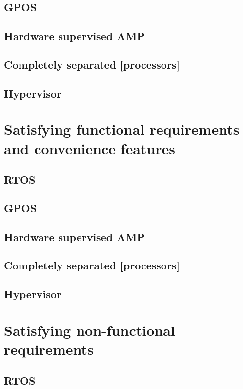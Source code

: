 \subsection{GPOS}
\subsection{Hardware supervised AMP}
\subsection{Completely separated [processors]}
\subsection{Hypervisor}


\section{Satisfying functional requirements and convenience features}
\subsection{RTOS}
\subsection{GPOS}
\subsection{Hardware supervised AMP}
\subsection{Completely separated [processors]}
\subsection{Hypervisor}


\section{Satisfying non-functional requirements}
\subsection{RTOS}
